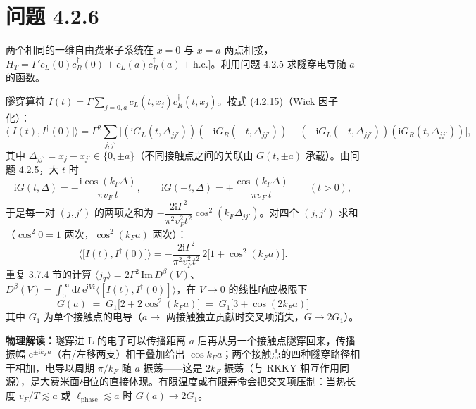 \section*{问题 4.2.6}
\begin{problem}
两个相同的一维自由费米子系统在 $x=0$ 与 $x=a$ 两点相接，$H_T=\Gamma\big[c_L(0)c_R^\dagger(0)+c_L(a)c_R^\dagger(a)+\text{h.c.}\big]$。利用问题 4.2.5 求隧穿电导随 $a$ 的函数。
\end{problem}
\solution
隧穿算符 $I(t)=\Gamma\sum_{j=0,a}c_L(t,x_j)c_R^\dagger(t,x_j)$。按式 (4.2.15)（Wick 因子化）：
\begin{equation*}
\big\langle\big[I(t),I^\dagger(0)\big]\big\rangle
=\Gamma^2\sum_{j,j'}\Big[(\mathrm{i}G_L(t,\Delta_{jj'}))(-\mathrm{i}G_R(-t,\Delta_{jj'}))
-(-\mathrm{i}G_L(-t,\Delta_{jj'}))(\mathrm{i}G_R(t,\Delta_{jj'}))\Big],
\end{equation*}
其中 $\Delta_{jj'}=x_j-x_{j'}\in\{0,\pm a\}$（不同接触点之间的关联由 $G(t,\pm a)$ 承载）。由问题 4.2.5，大 $t$ 时
\begin{equation*}
\mathrm{i}G(t,\Delta)=-\frac{\mathrm{i}\cos(k_F\Delta)}{\pi v_F\,t},\qquad
\mathrm{i}G(-t,\Delta)=+\frac{\cos(k_F\Delta)}{\pi v_F\,t}\qquad(t>0),
\end{equation*}
于是每一对 $(j,j')$ 的两项之和为 $-\dfrac{2\mathrm{i}\Gamma^2}{\pi^2v_F^2t^2}\cos^2(k_F\Delta_{jj'})$。对四个 $(j,j')$ 求和（$\cos^2 0=1$ 两次，$\cos^2(k_Fa)$ 两次）：
\begin{equation*}
\big\langle\big[I(t),I^\dagger(0)\big]\big\rangle
=-\frac{2\mathrm{i}\Gamma^2}{\pi^2v_F^2t^2}\,2\big[1+\cos^2(k_Fa)\big].
\end{equation*}
重复 3.7.4 节的计算 $\langle j_T\rangle=2\Gamma^2\,\mathrm{Im}\,D^\beta(V)$、$D^\beta(V)=\int_0^\infty\mathrm{d}t\,\mathrm{e}^{\mathrm{i}Vt}\langle[I(t),I^\dagger(0)]\rangle$，在 $V\to0$ 的线性响应极限下
\begin{equation*}
\boxed{\;G(a)\;=\;G_1\Big[2+2\cos^2(k_Fa)\Big]\;=\;G_1\Big[3+\cos(2k_Fa)\Big]\;}
\end{equation*}
其中 $G_1$ 为单个接触点的电导（$a\to$ 两接触独立贡献时交叉项消失，$G\to2G_1$）。

\textbf{物理解读：}隧穿进 L 的电子可以传播距离 $a$ 后再从另一个接触点隧穿回来，传播振幅 $\mathrm{e}^{\pm\mathrm{i}k_Fa}$（右/左移两支）相干叠加给出 $\cos k_Fa$；两个接触点的四种隧穿路径相干相加，电导以周期 $\pi/k_F$ 随 $a$ 振荡——这是 $2k_F$ 振荡（与 RKKY 相互作用同源），是大费米面相位的直接体现。有限温度或有限寿命会把交叉项压制：当热长度 $v_F/T\lesssim a$ 或 $\ell_{\text{phase}}\lesssim a$ 时 $G(a)\to2G_1$。

